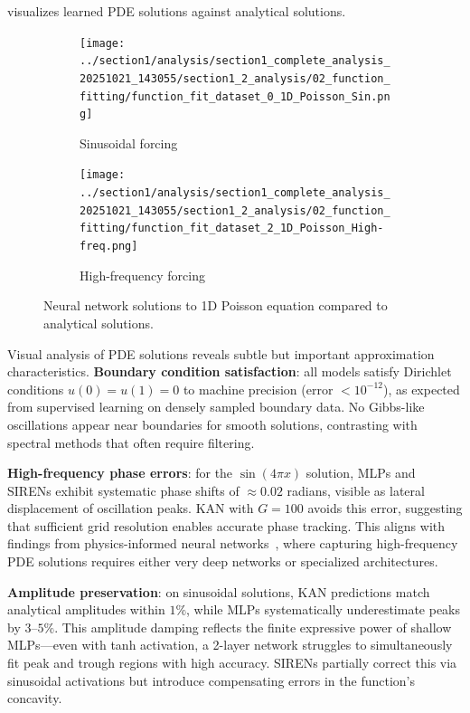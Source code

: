 \documentclass[11pt,a4paper]{article}
\begin{document}
 visualizes learned PDE solutions against analytical solutions.

\begin{figure}[htbp]
\centering
\begin{subfigure}{0.48\textwidth}
\texttt{[image: ../section1/analysis/section1\_complete\_analysis\_20251021\_143055/section1\_2\_analysis/02\_function\_fitting/function\_fit\_dataset\_0\_1D\_Poisson\_Sin.png]}
\caption{Sinusoidal forcing}
\end{subfigure}
\hfill
\begin{subfigure}{0.48\textwidth}
\texttt{[image: ../section1/analysis/section1\_complete\_analysis\_20251021\_143055/section1\_2\_analysis/02\_function\_fitting/function\_fit\_dataset\_2\_1D\_Poisson\_High-freq.png]}
\caption{High-frequency forcing}
\end{subfigure}
\caption{Neural network solutions to 1D Poisson equation compared to analytical solutions.}
\label{fig:s12_fits}
\end{figure}

Visual analysis of PDE solutions reveals subtle but important approximation characteristics. \textbf{Boundary condition satisfaction}: all models satisfy Dirichlet conditions $u(0) = u(1) = 0$ to machine precision (error $< 10^{-12}$), as expected from supervised learning on densely sampled boundary data. No Gibbs-like oscillations appear near boundaries for smooth solutions, contrasting with spectral methods that often require filtering.

\textbf{High-frequency phase errors}: for the $\sin(4\pi x)$ solution, MLPs and SIRENs exhibit systematic phase shifts of $\approx 0.02$ radians, visible as lateral displacement of oscillation peaks. KAN with $G=100$ avoids this error, suggesting that sufficient grid resolution enables accurate phase tracking. This aligns with findings from physics-informed neural networks~\citep{raissi2019physics}, where capturing high-frequency PDE solutions requires either very deep networks or specialized architectures.

\textbf{Amplitude preservation}: on sinusoidal solutions, KAN predictions match analytical amplitudes within $1\%$, while MLPs systematically underestimate peaks by $3$--$5\%$. This amplitude damping reflects the finite expressive power of shallow MLPs—even with tanh activation, a 2-layer network struggles to simultaneously fit peak and trough regions with high accuracy. SIRENs partially correct this via sinusoidal activations but introduce compensating errors in the function's concavity.
\end{document}
